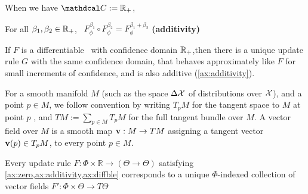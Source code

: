 When we have $\confdom := \Rplus$,

\TODO

\begin{CFaxioms}
	\item For all $\beta_1, \beta_2 \in \mathbb R_+$,~
		$F^{\beta_1}_\phi \circ F^{\beta_2}_\phi = F^{\beta_1 + \beta_2}_\phi$
		\hfill \textbf{(additivity)} \label{ax:additivity}
\end{CFaxioms}



\begin{prop}
	If $F$ is a differentiable \cofunc\ with confidence domain $\mathbb R_+$,then there is a unique update rule $G$ with the same confidence domain, that behaves approximately like $F$ for small increments of confidence, and is also additive (\cref{ax:additivity}).
\end{prop}





\label{sec:vecrep}
For a smooth manifold $M$
(such as the space $\Delta \mathcal X$ of distributions over $\mathcal X$),
and a point $p \in M$, we follow convention by writing $T_p M$ for the tangent space to $M$ at point $p$ \parencite{lee2013smooth}, and %
$TM := \sum_{p \in M} T_p M$ for the full tangent bundle over $M$.
%
A vector field over $M$ is a smooth map $\mathbf{v} : M \to T M$ assigning a tangent vector $\mathbf{v}(p) \in T_p M$, to every point $p \in M$.

\begin{theorem}
Every update rule $F : \Phi \times \mathbb R \to (\Theta  \to \Theta)$
satisfying \cref{ax:zero,ax:additivity,ax:diffble} corresponds to a unique
$\Phi$-indexed collection of vector fields
    $F' : \Phi \times \Theta \to T\Theta$
\end{theorem}

